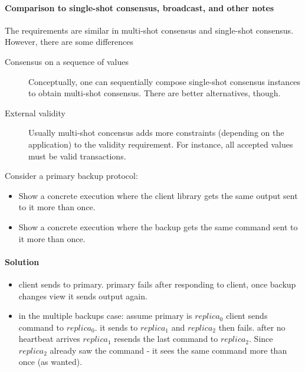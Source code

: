 \paragraph{Comparison to single-shot consensus, broadcast, and other notes}
The requirements are similar in multi-shot consensus and 
single-shot consensus. However, there are some differences
\begin{description}
    \item[Consensus on a sequence of values] Conceptually, one can sequentially
    compose single-shot consensus instances to obtain multi-shot consensus.
    There are better alternatives, though.

    \item[External validity] Usually multi-shot concensus adds more constraints 
    (depending on the application) to the validity requirement. 
    For instance, all accepted values must be valid transactions.
\end{description}



\begin{xca}[Quiz 1.J]
    Consider a primary backup protocol:
    \begin{itemize} 
        \item Show a concrete execution where the client library gets the same output sent to it more than once.
        \item Show a concrete execution where the backup gets the same command sent to it more than once.
    \end{itemize}

    \paragraph{Solution}
    \begin{itemize}
        \item client sends to primary. primary fails after responding to client, once backup changes view it sends output again.
        \item in the multiple backups case: assume primary is $replica_0$
         client sends command to $replica_0$. 
         it sends to $replica_1$ and $replica_2$ then fails.
         after no heartbeat arrives $replica_1$ resends the last command to $replica_2$. 
         Since $replica_2$ already saw the command - it sees the same command more than once (as wanted).
    \end{itemize}
\end{xca}

